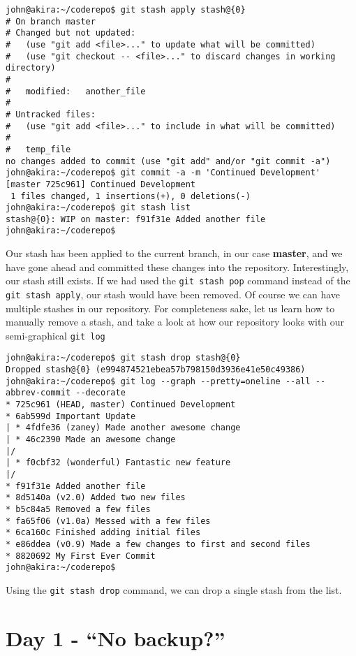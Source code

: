 \begin{Verbatim}[frame=leftline,framerule=1mm,fontsize=\relsize{-3}] 
john@akira:~/coderepo$ git stash apply stash@{0} 
# On branch master
# Changed but not updated:
#   (use "git add <file>..." to update what will be committed)
#   (use "git checkout -- <file>..." to discard changes in working directory)
#
#	modified:   another_file
#
# Untracked files:
#   (use "git add <file>..." to include in what will be committed)
#
#	temp_file
no changes added to commit (use "git add" and/or "git commit -a")
john@akira:~/coderepo$ git commit -a -m 'Continued Development'
[master 725c961] Continued Development
 1 files changed, 1 insertions(+), 0 deletions(-)
john@akira:~/coderepo$ git stash list
stash@{0}: WIP on master: f91f31e Added another file
john@akira:~/coderepo$ 
\end{Verbatim}

Our stash has been applied to the current branch, in our case \textbf{master}, and we have gone ahead and committed these changes into the repository.  Interestingly, our stash still exists.  If we had used the \texttt{git stash pop} command instead of the \texttt{git stash apply}, our stash would have been removed.  Of course we can have multiple stashes in our repository.  For completeness sake, let us learn how to manually remove a stash, and take a look at how our repository looks with our semi-graphical \texttt{git log}

\begin{Verbatim}[frame=leftline,framerule=1mm,fontsize=\relsize{-3}] 
john@akira:~/coderepo$ git stash drop stash@{0} 
Dropped stash@{0} (e994874521ebea57b798150d3936e41e50c49386)
john@akira:~/coderepo$ git log --graph --pretty=oneline --all --abbrev-commit --decorate
* 725c961 (HEAD, master) Continued Development
* 6ab599d Important Update
| * 4fdfe36 (zaney) Made another awesome change
| * 46c2390 Made an awesome change
|/  
| * f0cbf32 (wonderful) Fantastic new feature
|/  
* f91f31e Added another file
* 8d5140a (v2.0) Added two new files
* b5c84a5 Removed a few files
* fa65f06 (v1.0a) Messed with a few files
* 6ca160c Finished adding initial files
* e86ddea (v0.9) Made a few changes to first and second files
* 8820692 My First Ever Commit
john@akira:~/coderepo$ 
\end{Verbatim}

Using the \texttt{git stash drop} command, we can drop a single stash from the list.


\section{Day 1 - ``No backup?''}
